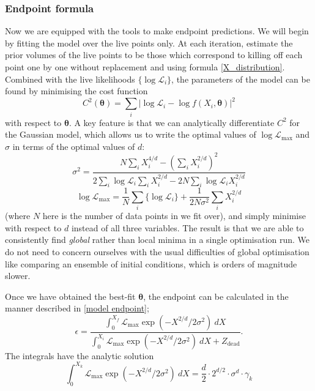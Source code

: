 \documentclass[usenatbib]{mnras}
\newcommand{\logL}{\{ \log \Like_i \}}
\newcommand{\thetab}{\bm{\theta}}
\newcommand{\logLm}{\log \Like_\mathrm{max}}
\newcommand{\Like}{\mathcal{L}}
\begin{document}
\subsubsection{Endpoint formula}
Now we are equipped with the tools to make endpoint predictions. We will begin by fitting the model over the live points only. At each iteration, estimate the prior volumes of the live points to be those which correspond to killing off each point one by one without replacement and using formula \eqref{X_distribution}. Combined with the live likelihoods $\logL$, the parameters of the model can be found by minimising the cost function
\begin{equation}\label{chi squared}
	C^2(\thetab) = \sum_i \left| \log \Like_i - \log f(X_i, \thetab) \right| ^2
\end{equation}
with respect to $\thetab$. A key feature is that we can analytically differentiate  $C^2$ for the Gaussian model, which allows us to write the optimal values of $\logLm$ and $\sigma$ in terms of the optimal values of $d$:
\begin{equation}
    \sigma^2 = \frac{N \sum_i X_i^{4/d} - \left(\sum_i X_i^{2/d}\right)^2}{2 \sum_i \log \Like_i \sum_i X_i^{2/d} - 2N \sum_i \log \Like_i X_i^{2/d}}
\end{equation}
\begin{equation}
    \logLm = \frac{1}{N} \sum_i \logL + \frac{1}{2N\sigma^2} \sum_i X_i^{2/d} 
\end{equation}
(where $N$ here is the number of data points in we fit over), and simply minimise with respect to $d$ instead of all three variables. The result is that we are able to consistently find \textit{global} rather than local minima in a single optimisation run. We do not need to concern ourselves with the usual difficulties of global optimisation like comparing an ensemble of initial conditions, which is orders of magnitude slower.
\par
Once we have obtained the best-fit $\thetab$, the endpoint can be calculated in the manner described in \eqref{model endpoint};
\begin{equation}
	\epsilon = \frac{\int_0^{X_f} \Like_\mathrm{max} \exp\left(-X^{2/d}/2\sigma^2\right)\ dX}{\int_0^{X_i} \Like_\mathrm{max} \exp\left(-X^{2/d}/2\sigma^2\right)\ dX + Z_\mathrm{dead}}.
\end{equation}
The integrals have the analytic solution
\begin{equation}
	\int_0^{X_k} \Like_\mathrm{max} \exp\left(-X^{2/d}/2\sigma^2\right)\ dX = \frac{d}{2} \cdot 2^{d/2} \cdot \sigma^{d} \cdot \gamma_k
\end{equation}
\end{document}
